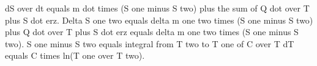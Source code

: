 dS over dt equals m dot times (S one minus S two) plus the sum of Q dot over T plus S dot erz. Delta S one two equals delta m one two times (S one minus S two) plus Q dot over T plus S dot erz equals delta m one two times (S one minus S two). S one minus S two equals integral from T two to T one of C over T dT equals C times ln(T one over T two).